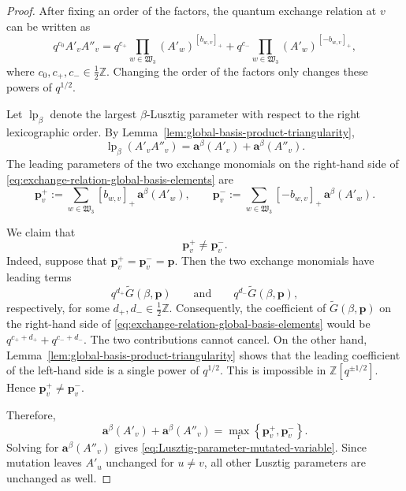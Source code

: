\documentclass[12pt, reqno]{amsart}
\theoremstyle{plain}
\theoremstyle{definition}
\numberwithin{equation}{section}
\newcommand{\ZZ}{\mathbb{Z}}
\begin{document}
\begin{proof}
After fixing an order of the factors, the quantum exchange relation at
\(v\) can be written as
\begin{equation}\label{eq:exchange-relation-global-basis-elements}
    q^{c_0}A'_vA''_v
    =
    q^{c_+}
    \prod_{w\in\mathfrak W_3}
        (A'_w)^{[b_{w,v}]_+}
    +
    q^{c_-}
    \prod_{w\in\mathfrak W_3}
        (A'_w)^{[-b_{w,v}]_+},
\end{equation}
where \(c_0,c_+,c_-\in\frac12\ZZ\). Changing the order of the
factors only changes these powers of \(q^{1/2}\).

Let \(\operatorname{lp}_\beta\) denote the largest
\(\beta\)-Lusztig parameter with respect to the right lexicographic
order. By
Lemma~\ref{lem:global-basis-product-triangularity},
\[
    \operatorname{lp}_\beta(A'_vA''_v)
    =
    \mathbf a^\beta(A'_v)
    +
    \mathbf a^\beta(A''_v).
\]
The leading parameters of the two exchange monomials on the
right-hand side of
\eqref{eq:exchange-relation-global-basis-elements} are
\[
    \mathbf p_v^+
    :=
    \sum_{w\in\mathfrak W_3}
        [b_{w,v}]_+\,
        \mathbf a^\beta(A'_w),
    \qquad
    \mathbf p_v^-
    :=
    \sum_{w\in\mathfrak W_3}
        [-b_{w,v}]_+\,
        \mathbf a^\beta(A'_w).
\]

We claim that
\[
    \mathbf p_v^+\neq\mathbf p_v^-.
\]
Indeed, suppose that
\(\mathbf p_v^+=\mathbf p_v^-=\mathbf p\). Then the two exchange
monomials have leading terms
\[
    q^{d_+}\widetilde G(\beta,\mathbf p)
    \qquad\text{and}\qquad
    q^{d_-}\widetilde G(\beta,\mathbf p),
\]
respectively, for some \(d_+,d_-\in\frac12\ZZ\). Consequently, the
coefficient of \(\widetilde G(\beta,\mathbf p)\) on the right-hand
side of
\eqref{eq:exchange-relation-global-basis-elements} would be
\(
    q^{c_++d_+}+q^{c_-+d_-}.
\)
The two contributions cannot cancel. On the other hand, Lemma~\ref{lem:global-basis-product-triangularity}
shows that the leading coefficient of the left-hand side is a single
power of \(q^{1/2}\). This is impossible in
\(\ZZ[q^{\pm1/2}]\). Hence
\(\mathbf p_v^+\neq\mathbf p_v^-\).

Therefore,
\[
    \mathbf a^\beta(A'_v)
    +
    \mathbf a^\beta(A''_v)
    =
    \max_{\mathrm r}
    \left\{
        \mathbf p_v^+,\mathbf p_v^-
    \right\}.
\]
Solving for \(\mathbf a^\beta(A''_v)\) gives
\eqref{eq:Lusztig-parameter-mutated-variable}. Since mutation leaves
\(A'_u\) unchanged for \(u\neq v\), all other Lusztig parameters are
unchanged as well.
\end{proof}
\end{document}
